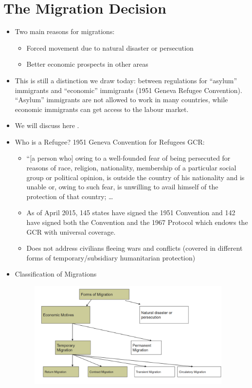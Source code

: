 \section{The Migration Decision}
\begin{itemize}
    \item Two main reasons for migrations:
    \begin{itemize}
        \item Forced movement due to natural disaster or persecution
        \item Better economic prospects in other areas
    \end{itemize}
    \item This is still a distinction we draw today: between regulations for “asylum” immigrants and “economic” immigrants (1951 Geneva Refugee Convention). “Asylum” immigrants are not allowed to work in many countries, while economic immigrants can get access to the labour market.
    \item We will discuss here .
    \item Who is a Refugee? 1951 Geneva Convention for Refugees GCR:
    \begin{itemize}
        \item “[a person who] owing to a well-founded fear of being persecuted for reasons of race, religion, nationality, membership of a particular social group or political opinion, is outside the country of his nationality and is unable or, owing to such fear, is unwilling to avail himself of the protection of that country; …
        \item As of April 2015, 145 states have signed the 1951 Convention and 142 have signed both the Convention and the 1967 Protocol which endows the GCR with universal coverage. 
        \item Does not address civilians fleeing wars and conflicts (covered in different forms of temporary/subsidiary humanitarian protection)
    \end{itemize}
    \item Classification of Migrations
    \begin{figure}[H]
                \centering
                \includegraphics[width=4in]{images/ch11/12.png}

\end{figure}
\end{itemize}
